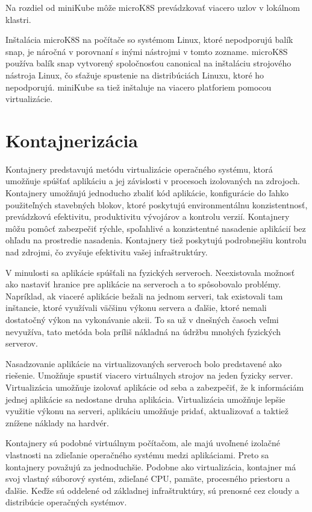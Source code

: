 Na rozdiel od miniKube môže microK8S prevádzkovať viacero uzlov v lokálnom klastri.

Inštalácia microK8S na počítače so systémom Linux, ktoré nepodporujú balík snap, je náročná v porovnaní s inými nástrojmi v tomto zozname. microK8S používa balík snap vytvorený spoločnosťou canonical na inštaláciu strojového nástroja Linux, čo sťažuje spustenie na distribúciách Linuxu, ktoré ho nepodporujú. miniKube sa tiež inštaluje na viacero platforiem pomocou virtualizácie.



\section{Kontajnerizácia}

Kontajnery predstavujú metódu virtualizácie operačného systému, ktorá umožňuje spúšťať aplikáciu a jej závislosti v procesoch izolovaných na zdrojoch. Kontajnery umožňujú jednoducho zbaliť kód aplikácie, konfigurácie do ľahko použiteľných stavebných blokov, ktoré poskytujú environmentálnu konzistentnosť, prevádzkovú efektivitu, produktivitu vývojárov a kontrolu verzií. Kontajnery môžu pomôcť zabezpečiť rýchle, spoľahlivé a konzistentné nasadenie aplikácií bez ohľadu na prostredie nasadenia. Kontajnery tiež poskytujú podrobnejšiu kontrolu nad zdrojmi, čo zvyšuje efektivitu vašej infraštruktúry.

V minulosti sa aplikácie spúšťali na fyzických serveroch. Neexistovala možnosť ako nastaviť hranice pre aplikácie na serveroch a to spôsobovalo problémy. Napríklad, ak viaceré aplikácie bežali na jednom serveri, tak existovali tam inštancie, ktoré využívali väčšinu výkonu servera a ďalšie, ktoré nemali dostatočný výkon na vykonávanie akcii. To sa už v dnešných časoch veľmi nevyužíva, tato metóda bola príliš nákladná na údržbu mnohých fyzických serverov.

Nasadzovanie aplikácie na virtualizovaných serveroch bolo predstavené ako riešenie. Umožňuje spustiť viacero virtuálnych strojov na jeden fyzicky server. Virtualizácia umožňuje izolovať aplikácie od seba a zabezpečiť, že k informáciám jednej aplikácie sa nedostane druha aplikácia. Virtualizácia umožňuje lepšie využitie výkonu na serveri, aplikáciu umožňuje pridať, aktualizovať a taktiež znížene náklady na hardvér.

Kontajnery sú podobné virtuálnym počítačom, ale majú uvoľnené izolačné vlastnosti na zdieľanie operačného systému medzi aplikáciami. Preto sa kontajnery považujú za jednoduchšie. Podobne ako virtualizácia, kontajner má svoj vlastný súborový systém, zdieľané CPU, pamäte, procesného priestoru a ďalšie. Keďže sú oddelené od základnej infraštruktúry, sú prenosné cez cloudy a distribúcie operačných systémov.


